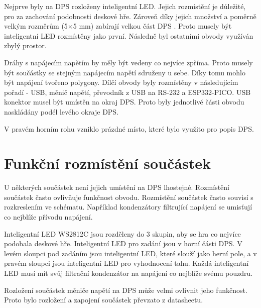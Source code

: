   Nejprve byly na DPS rozloženy inteligentní LED. Jejich rozmístění je důležité, pro za zachování podobnosti deskové hře. Zároveň 
  díky jejich množství a poměrně velkým rozměrům (5$\times$5 mm) zabírají velkou část DPS \cite{WS2812C_datasheet}. Proto musely být 
  inteligentní LED rozmístěny jako první. Následně byl ostatními obvody využíván zbylý prostor. 

  Dráhy s napájecím napětím by měly být vedeny co nejvíce zpříma. Proto musely být součástky se stejným napájecím napětí sdruženy u sebe. 
  Díky tomu mohlo být napájení tvořeno polygony. Dílčí obvody byly rozmístěny v následujícím pořadí - USB, měnič napětí, převodník z USB 
  na RS-232 a ESP332-PICO. USB konektor musel být umístěn na okraj DPS. Proto byly jednotlivé části obvodu naskládány podél levého okraje DPS.

  V pravém horním rohu vzniklo prázdné místo, které bylo využito pro popis DPS.

  \section{Funkční rozmístění součástek}
  U některých součástek není jejich umístění na DPS lhostejné. Rozmístění součástek často ovlivňuje funkčnost obvodu. Rozmístění součástek 
  často souvisí s rozkreslením ve schématu. Například kondenzátory filtrující napájení se umisťují co nejblíže přívodu napájení.
  
  Inteligentní LED WS2812C jsou rozděleny do 3 skupin, aby se hra co nejvíce podobala deskové hře. Inteligentní LED pro zadání 
  jsou v horní části DPS. V levém sloupci pod zadáním jsou inteligentní LED, které slouží jako herní pole, a v pravém sloupci 
  jsou inteligentní LED pro vyhodnocení tahu. Každá inteligentní LED musí mít svůj filtrační kondenzátor na napájení co nejblíže 
  svému pouzdru.

  Rozložení součástek měniče napětí na DPS může velmi ovlivnit jeho funkčnost. Proto bylo rozložení a zapojení součástek 
  převzato z datasheetu.


